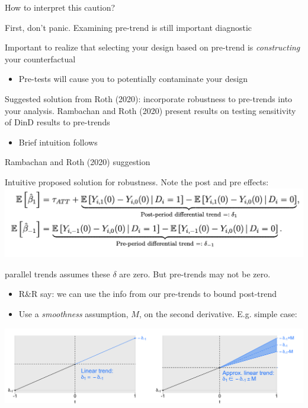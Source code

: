 \documentclass[notes,11pt, aspectratio=169]{beamer}
\newenvironment{wideitemize}{\itemize\addtolength{\itemsep}{10pt}}{\enditemize}
\begin{document}
\begin{frame}{How to interpret this caution?}
  \begin{wideitemize}
  \item First, don't panic. Examining pre-trend is still important
    diagnostic
  \item Important to realize that selecting your design based on
    pre-trend is \emph{constructing} your counterfactual
    \begin{itemize}
    \item Pre-tests will cause you to potentially contaminate your
      design
    \end{itemize}
  \item Suggested solution from Roth (2020): incorporate robustness to
    pre-trends into your analysis. Rambachan and Roth (2020) present
    results on testing sensitivity of DinD results to pre-trends
    \begin{itemize}
    \item Brief intuition follows
    \end{itemize}
  \end{wideitemize}
\end{frame}


\begin{frame}{Rambachan and Roth (2020) suggestion}
  \begin{wideitemize}
  \item Intuitive proposed solution for robustness. Note the post and pre effects:
    \includegraphics[width=0.7\linewidth]{images/rothpic6.png}
    \vspace{-10pt}
  \item parallel trends assumes these $\delta$ are zero. But pre-trends may not be zero. 
    \begin{itemize}
    \item R\&R say: we can use the info from our pre-trends to bound
      post-trend
    \item Use a \emph{smoothness} assumption, $M$, on the second derivative. E.g. simple case:
    \end{itemize}
    \includegraphics[width=\linewidth]{images/rothpic7.png}    
  \end{wideitemize}
\end{frame}
\end{document}
